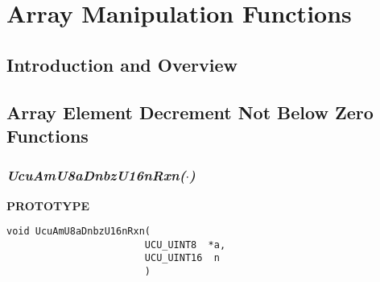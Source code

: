 
\chapter{Array Manipulation Functions}

\label{cami0}


\section{Introduction and Overview}
\label{cami0:siov0}


\section{Array Element Decrement Not Below Zero Functions}
\label{cami0:sdez0}


\subsection[\emph{UcuAmU8aDnbzU16nRxn(\protect\mbox{\protect$\cdot$})}]
           {\emph{UcuAmU8aDnbzU16nRxn(\protect\mbox{\protect\boldmath $\cdot$})}}
\label{cami0:sadx0:sdez0}

%

\noindent\textbf{PROTOTYPE}
\begin {list}{}{\setlength{\leftmargin}{0.25in}\setlength{\topsep}{0.0in}}
\item
\begin{verbatim}
void UcuAmU8aDnbzU16nRxn(
                        UCU_UINT8  *a,
                        UCU_UINT16  n
                        )
\end{verbatim}
\end{list}
\vspace{2.8ex}

